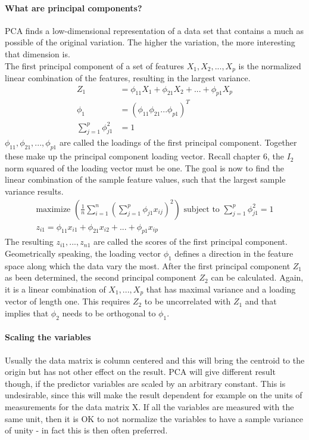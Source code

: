 \documentclass[../document.tex]{subfiles}
\begin{document}
	\paragraph{What are principal components?}
	PCA finds a low-dimensional representation of a data set that contains a much as possible of the original variation. The higher the variation, the more interesting that dimension is.\\
	The first principal component of a set of features \(X_{1},X_{2},...,X_{p}\) is the normalized linear combination of the features, resulting in the largest variance.
	\begin{equation}
	\begin{split}
		Z_{1}&=\phi_{11}X_{1}+\phi_{21}X_{2}+...+\phi_{p1}X_{p}\\
		\phi_{1} &= (\phi_{11} \phi_{21} ... \phi_{p1})^T\\
		\sum_{j=1}^{p}\phi_{j1}^2&=1
	\end{split}
	\end{equation}
	\(\phi_{11}, \phi_{21},...,\phi_{p1}\) are called the loadings of the first principal component. Together these make up the principal component loading vector. Recall chapter 6, the \(I_{2}\) norm squared of the loading vector must be one. The goal is now to find the linear combination of the sample feature values, such that the largest sample variance results.
	\begin{equation}
	\begin{split}
		\text{maximize }(\frac{1}{n}\sum_{i=1}^{n}(\sum_{j=1}^{p}\phi_{j1}x_{ij})^2)\text{ subject to }\sum_{j=1}^{p}\phi_{j1}^2=1\\
		z_{i1}=\phi_{11}x_{i1}+\phi_{21}x_{i2}+...+\phi_{p1}x_{ip}
	\end{split}
	\end{equation}
	The resulting \(z_{i1},...,z_{n1}\) are called the scores of the first principal component. Geometrically speaking, the loading vector \(\phi_{1}\) defines a direction in the feature space along which the data vary the most. After the first principal component \(Z_{1}\) as been determined, the second principal component \(Z_{2}\) can be calculated. Again, it is a linear combination of \(X_{1},...,X_{p}\) that has maximal variance and a loading vector of length one. This requires \(Z_{2}\) to be uncorrelated with \(Z_{1}\) and that implies that \(\phi_{2}\) needs to be orthogonal to \(\phi_{1}\).
	\paragraph{Scaling the variables}
	Usually the data matrix is column centered and this will bring the centroid to the origin but has not other effect on the result. PCA will give different result though, if the predictor variables are scaled by an arbitrary constant. This is undesirable, since this will make the result dependent for example on the units of measurements for the data matrix X. If all the variables are measured with the same unit, then it is OK to not normalize the variables to have a sample variance of unity - in fact this is then often preferred.
\end{document}

